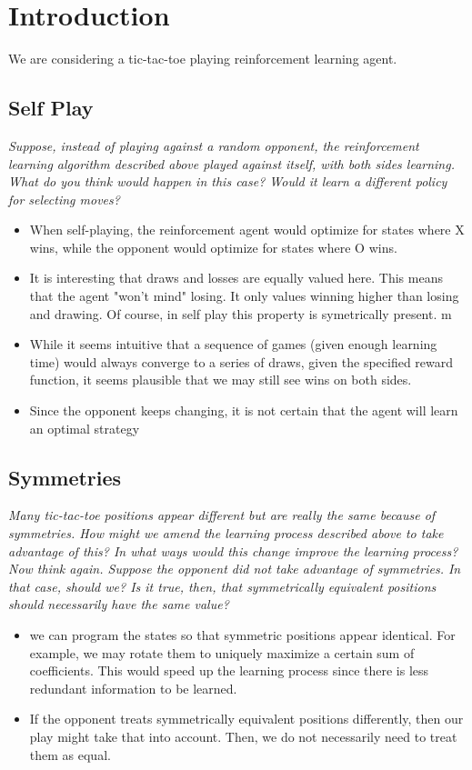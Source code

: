 \documentclass{article}
\begin{document}
\section{Introduction}
We are considering a tic-tac-toe playing reinforcement learning agent.
\subsection{Self Play}
\textit{Suppose, instead of playing against a random opponent, the reinforcement learning algorithm described above played against itself, with both sides learning. What do you think would happen in this case? Would it learn a different policy for selecting moves?}\\
\begin{itemize}
\item When self-playing, the reinforcement agent would optimize for states where X wins, while the opponent would optimize for states where O wins.
\item It is interesting that draws and losses are equally valued here. This means that the agent "won't mind" losing. It only values winning higher than losing and drawing. Of course, in self play this property is symetrically present. m
\item While it seems intuitive that a sequence of games (given enough learning time) would always converge to a series of draws, given the specified reward function, it seems plausible that we may still see wins on both sides.
\item Since the opponent keeps changing, it is not certain that the agent will learn an optimal strategy
\end{itemize}

\subsection{Symmetries}
\textit{Many tic-tac-toe positions appear different but are really the same because of symmetries. How might we amend the learning process described above to take advantage of this? In what ways would this change improve the learning process? Now think again. Suppose the opponent did not take advantage of symmetries. In that case, should we? Is it true, then, that symmetrically equivalent positions should necessarily have the same value?}
\begin{itemize}
\item we can program the states so that symmetric positions appear identical. For example, we may rotate them to uniquely maximize a certain sum of coefficients. This would speed up the learning process since there is less redundant information to be learned.
\item If the opponent treats symmetrically equivalent positions differently, then our play might take that into account. Then, we do not necessarily need to treat them as equal.
\end{itemize}
\end{document}
